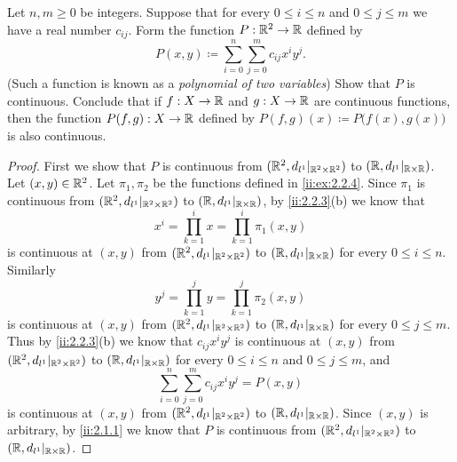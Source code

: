 \begin{ex}\label{ii:ex:2.2.5}
  Let \(n, m \geq 0\) be integers.
  Suppose that for every \(0 \leq i \leq n\) and \(0 \leq j \leq m\) we have a real number \(c_{ij}\).
  Form the function \(P : \mathbb{R}^2 \to \mathbb{R}\) defined by
  \[
    P(x, y) \coloneqq \sum_{i = 0}^n \sum_{j = 0}^m c_{ij} x^i y^j.
  \]
  (Such a function is known as a \emph{polynomial of two variables})
  Show that \(P\) is continuous.
  Conclude that if \(f : X \to \mathbb{R}\) and \(g : X \to \mathbb{R}\) are continuous functions, then the function \(P(f, g) : X \to \mathbb{R}\) defined by \(P(f, g)(x) \coloneqq P\big(f(x), g(x)\big)\) is also continuous.
\end{ex}

\begin{proof}
  First we show that \(P\) is continuous from \((\mathbb{R}^2, d_{l^1}|_{\mathbb{R}^2 \times \mathbb{R}^2})\) to \((\mathbb{R}, d_{l^1}|_{\mathbb{R} \times \mathbb{R}})\).
  Let \((x, y) \in \mathbb{R}^2\).
  Let \(\pi_1, \pi_2\) be the functions defined in \cref{ii:ex:2.2.4}.
  Since \(\pi_1\) is continuous from \((\mathbb{R}^2, d_{l^1}|_{\mathbb{R}^2 \times \mathbb{R}^2})\) to \((\mathbb{R}, d_{l^1}|_{\mathbb{R} \times \mathbb{R}})\), by \cref{ii:2.2.3}(b) we know that
  \[
    x^i = \prod_{k = 1}^i x = \prod_{k = 1}^i \pi_1(x, y)
  \]
  is continuous at \((x, y)\) from \((\mathbb{R}^2, d_{l^1}|_{\mathbb{R}^2 \times \mathbb{R}^2})\) to \((\mathbb{R}, d_{l^1}|_{\mathbb{R} \times \mathbb{R}})\) for every \(0 \leq i \leq n\).
  Similarly
  \[
    y^j = \prod_{k = 1}^j y = \prod_{k = 1}^j \pi_2(x, y)
  \]
  is continuous at \((x, y)\) from \((\mathbb{R}^2, d_{l^1}|_{\mathbb{R}^2 \times \mathbb{R}^2})\) to \((\mathbb{R}, d_{l^1}|_{\mathbb{R} \times \mathbb{R}})\) for every \(0 \leq j \leq m\).
  Thus by \cref{ii:2.2.3}(b) we know that \(c_{ij} x^i y^j\) is continuous at \((x, y)\) from \((\mathbb{R}^2, d_{l^1}|_{\mathbb{R}^2 \times \mathbb{R}^2})\) to \((\mathbb{R}, d_{l^1}|_{\mathbb{R} \times \mathbb{R}})\) for every \(0 \leq i \leq n\) and \(0 \leq j \leq m\), and
  \[
    \sum_{i = 0}^n \sum_{j = 0}^m c_{ij} x^i y^j = P(x, y)
  \]
  is continuous at \((x, y)\) from \((\mathbb{R}^2, d_{l^1}|_{\mathbb{R}^2 \times \mathbb{R}^2})\) to \((\mathbb{R}, d_{l^1}|_{\mathbb{R} \times \mathbb{R}})\).
  Since \((x, y)\) is arbitrary, by \cref{ii:2.1.1} we know that \(P\) is continuous from \((\mathbb{R}^2, d_{l^1}|_{\mathbb{R}^2 \times \mathbb{R}^2})\) to \((\mathbb{R}, d_{l^1}|_{\mathbb{R} \times \mathbb{R}})\).


\end{proof}
